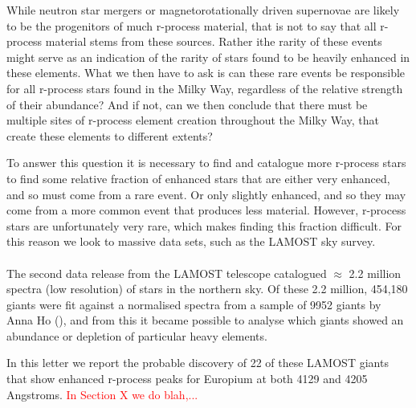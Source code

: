 \documentclass[a4paper,fleqn,usenatbib]{mnras}
\newcommand{\todo}[1]{\textcolor{red}{#1}}
\begin{document}
While neutron star mergers or magnetorotationally driven supernovae are likely to be the progenitors of much r-process material, that is not to say that all r-process material stems from these sources. Rather ithe rarity of these events might serve as an indication of the rarity of stars found to be heavily enhanced in these elements. What we then have to ask is can these rare events be responsible for all r-process stars found in the Milky Way, regardless of the relative strength of their abundance? And if not, can we then conclude that there must be multiple sites of r-process element creation throughout the Milky Way, that create these elements to different extents?

To answer this question it is necessary to find and catalogue more r-process stars to find some relative fraction of enhanced stars that are either very enhanced, and so must come from a rare event. Or only slightly enhanced, and so they may come from a more common event that produces less material. However, r-process stars are unfortunately very rare, which makes finding this fraction difficult. For this reason we look to massive data sets, such as the LAMOST sky survey.
\\\\
The second data release from the LAMOST telescope catalogued $\approx$ 2.2 million spectra (low resolution) of stars in the northern sky. Of these 2.2 million, 454,180 giants were fit against a normalised spectra from a sample of 9952 giants by Anna Ho (\cite{AnnaHo2017}), and from this it became possible to analyse which giants showed an abundance or depletion of particular heavy elements. 

In this letter we report the probable discovery of 22 of these LAMOST giants that show enhanced r-process peaks for Europium at both 4129 and 4205 Angstroms.
\todo{In Section X we do blah,...}

\end{document}
